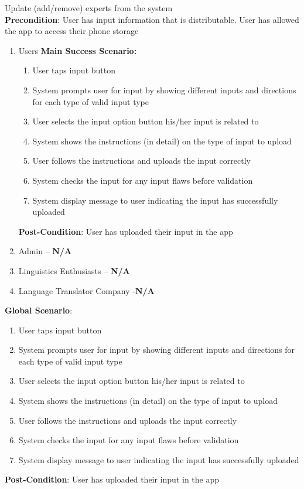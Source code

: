\item Update (add/remove) experts from the system
	\\ \textbf{Precondition}: User has input information that is distributable. User has allowed the app to access their phone storage
	\begin{enumerate}[{\bf VP1.}]
		\item Users
		\textbf{Main Success Scenario:}
		\begin{enumerate}[{\bf 1.}]
			\item User taps input button 
			\item System prompts user for input by showing different inputs and directions for each type of valid input type
			\item User selects the input option button his/her input is  related to
			\item System shows the instructions (in detail) on the type of input to upload
			\item User follows the instructions and uploads the input correctly
			\item System checks the input for any input flaws before validation
			\item System display message to user indicating the input has successfully uploaded
		\end{enumerate}
		\textbf{Post-Condition}: User has uploaded their input in the app
		\item Admin – \textbf{N/A}
		\item Linguistics Enthusiasts – \textbf{N/A}
		\item Language Translator Company -\textbf{N/A}
	\end{enumerate}
	\textbf{Global Scenario}:
	\begin{enumerate}[{\bf 1.}]
		\item User taps input button 
		\item System prompts user for input by showing different inputs and directions for each type of valid input type
		\item User selects the input option button his/her input is  related to
		\item System shows the instructions (in detail) on the type of input to upload
		\item User follows the instructions and uploads the input correctly
		\item System checks the input for any input flaws before validation
		\item System display message to user indicating the input has successfully uploaded
	\end{enumerate}
	\textbf{Post-Condition}: User has uploaded their input in the app